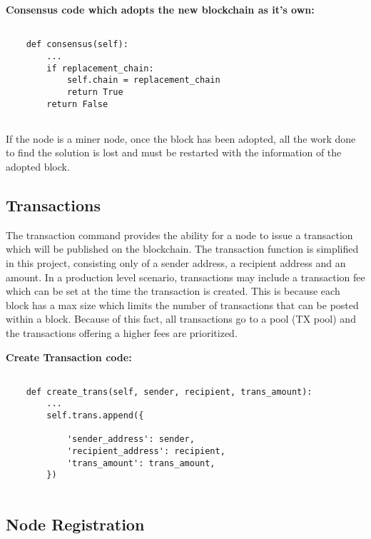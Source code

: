 \bigskip
\noindent
\textbf{Consensus code which adopts the new blockchain 
as it's own:}
\begin{footnotesize}
\begin{verbatim}

    def consensus(self):
        ...
	    if replacement_chain:
            self.chain = replacement_chain
            return True
        return False
	
\end{verbatim}
\end{footnotesize}

If the node is a miner node, once the block has been adopted, all the
work done to find the solution is lost and must be restarted with the
information of the adopted block.

\subsection{Transactions}

The transaction command provides the ability for a node to issue a
transaction which will be published on the blockchain. The transaction
function is simplified in this project, consisting only of a sender
address, a recipient address and an amount. In a production level
scenario, transactions may include a transaction fee which can be set
at the time the transaction is created. This is because each block has
a max size which limits the number of transactions that can be posted
within a block. Because of this fact, all transactions go to a pool
(TX pool) and the transactions offering a higher fees are prioritized.

\bigskip
\noindent
\textbf{Create Transaction code:}
\begin{footnotesize}
\begin{verbatim}

    def create_trans(self, sender, recipient, trans_amount):
        ...
        self.trans.append({

            'sender_address': sender,
            'recipient_address': recipient,
            'trans_amount': trans_amount,
        })
        
\end{verbatim}
\end{footnotesize}

\subsection{Node Registration}

